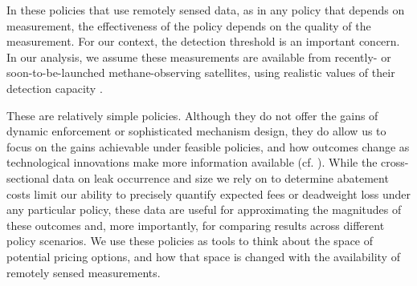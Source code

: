 In these policies that use remotely sensed data, as in any policy that depends on measurement, the effectiveness of the policy depends on the quality of the measurement.
For our context, the detection threshold is an important concern.
In our analysis, we assume these measurements are available from recently- or soon-to-be-launched methane-observing satellites, using realistic values of their detection capacity
\parencite{Cusworth/Jacob/Varon/Miller/Liu/Chance/Thorpe/Duren/Miller/Thompson/Frankenberg/Guanter/Randles:2019}.


These are relatively simple policies.
Although they do not offer the gains of dynamic enforcement or sophisticated mechanism design, they do allow us to focus on the gains achievable under
feasible policies, and how outcomes change as technological innovations make more information available
(cf.
\cite{%
Blundell/Gowrisankaran/Langer:2020,
Cicala/Hemous/Olsen:2019,
Oestreich:2017,
}).
While the cross-sectional data on leak occurrence and size we rely on to determine abatement costs limit our ability to precisely quantify expected
fees or deadweight loss under any particular policy, these data are useful for approximating the magnitudes of these outcomes and, more importantly, for
comparing results across different policy scenarios.
We use these policies as tools to think about the space of potential pricing options, and how that space is changed with the availability of remotely sensed measurements.




